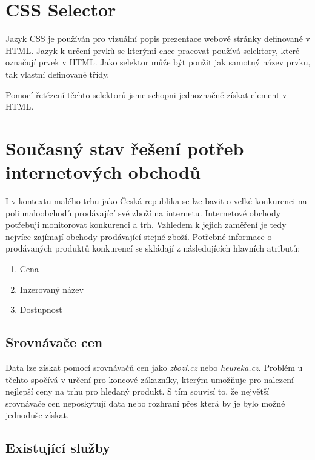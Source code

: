 \documentclass[thesis=B,czech]{FITthesis}[2012/06/26]
\begin{document}
\section{CSS Selector}
Jazyk CSS je používán pro vizuální popis prezentace webové stránky definované v HTML. Jazyk k určení prvků se kterými
chce pracovat používá selektory, které označují prvek v HTML. Jako selektor může být použit jak samotný název prvku,
tak vlastní definované třídy.\cite{CSS}
\par
Pomocí řetězení těchto selektorů jsme schopni jednoznačně získat element v HTML.

\newpage

\section{Současný stav řešení potřeb internetových obchodů}
I v kontextu malého trhu jako Česká republika se lze bavit o velké konkurenci na poli 
maloobchodů prodávající své zboží na internetu.
Internetové obchody potřebují monitorovat konkurenci a trh. Vzhledem k jejich zaměření je tedy nejvíce zajímají 
obchody prodávající stejné zboží. Potřebné informace o prodávaných produktů konkurencí 
se skládají z následujících hlavních atributů:

\begin{enumerate}
\item Cena
\item Inzerovaný název
\item Dostupnost
\end{enumerate}

\subsection{Srovnávače cen}

Data lze získat pomocí srovnávačů cen jako \textit{zbozi.cz}\cite{heureka} 
nebo \textit{heureka.cz}\cite{zbozi}. Problém u těchto spočívá v určení pro koncové zákazníky, kterým umožňuje
pro nalezení nejlepší ceny na trhu pro hledaný produkt. S tím souvisí to, že největší srovnávače cen neposkytují data nebo
rozhraní přes která by je bylo možné jednoduše získat.

\subsection{Existující služby}
\end{document}
